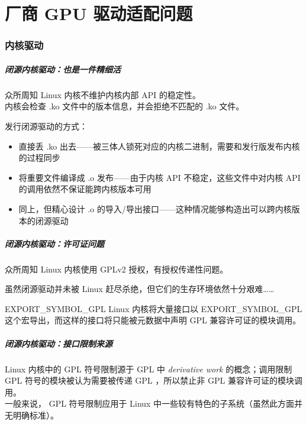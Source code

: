 \documentclass{ctexbeamer}
\begin{document}
\part{厂商 GPU 驱动适配问题}
\frame{\partpage}

\section{内核驱动}

\begin{frame}
    \frametitle{闭源内核驱动：也是一件精细活}
    \begin{block}{众所周知}
        Linux 内核不维护内核内部 API 的稳定性。\\
        内核会检查 .ko 文件中的版本信息，并会拒绝不匹配的 .ko 文件。
    \end{block}
    发行闭源驱动的方式：
    \begin{itemize}
        \item 直接丢 .ko 出去——被三体人锁死对应的内核二进制，需要和发行版发布内核的过程同步
        \item 将重要文件编译成 .o 发布——由于内核 API 不稳定，这些文件中对内核 API 的调用依然不保证能跨内核版本可用
        \item 同上，但精心设计 .o 的导入/导出接口——这种情况能够构造出可以跨内核版本的闭源驱动
    \end{itemize}
\end{frame}

\begin{frame}
    \frametitle{闭源内核驱动：许可证问题}
    \begin{block}{众所周知}
        Linux 内核使用 GPLv2 授权，有授权传递性问题。
    \end{block}
    虽然闭源驱动并未被 Linux 赶尽杀绝，但它们的生存环境依然十分艰难……\\
    \begin{block}{EXPORT\_SYMBOL\_GPL}
        Linux 内核将大量接口以 EXPORT\_SYMBOL\_GPL 这个宏导出，而这样的接口将只能被元数据中声明 GPL 兼容许可证的模块调用。
    \end{block}
\end{frame}

\begin{frame}
    \frametitle{闭源内核驱动：接口限制来源}
    Linux 内核中的 GPL 符号限制源于 GPL 中 \textit{derivative work} 的概念；调用限制 GPL 符号的模块被认为需要被传递 GPL ，所以禁止非 GPL 兼容许可证的模块调用。\\
    一般来说， GPL 符号限制应用于 Linux 中一些较有特色的子系统（虽然此方面并无明确标准）。
\end{frame}
\end{document}
